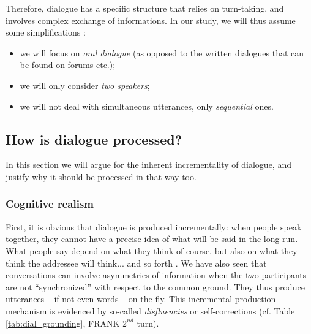 \documentclass[11pt]{article}
\begin{document}
			Therefore, dialogue has a specific structure that relies on turn-taking, and involves complex exchange of informations. In our study, we will thus assume some simplifications :
			\begin{itemize}
				\item we will focus on \textit{oral dialogue} (as opposed to the written dialogues that can be found on forums etc.); \vspace{-2mm}
				\item we will only consider \textit{two speakers}; \vspace{-2mm}
				\item we will not deal with simultaneous utterances, only \textit{sequential} ones.
			\end{itemize}
			
		\subsection{How is dialogue processed?}
			In this section we will argue for the inherent incrementality of dialogue, and justify why it should be processed in that way too.
			\subsubsection{Cognitive realism}
				First, it is obvious that dialogue is produced incrementally: when people speak together, they cannot have a precise idea of what will be said in the long run. What people say depend on what they think of course, but also on what they think the addressee will think... and so forth \cite{frank2016}. We have also seen that conversations can involve asymmetries of information when the two participants are not ``synchronized'' with respect to the common ground. They thus produce utterances -- if not even words -- on the fly. This incremental production mechanism is evidenced by so-called \textit{disfluencies} or self-corrections (cf. Table \ref{tab:dial_grounding}, FRANK $2^{nd}$ turn).\\
				
\end{document}
